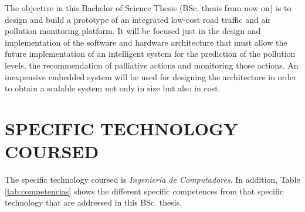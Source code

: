 \documentclass{pre-tfg}
\begin{document}
The objective in this Bachelor of Science Thesis (BSc. thesis from now on) is to design and build a prototype of an integrated low-cost road traffic and air pollution monitoring platform. It will be focused just in the design and implementation of the software and hardware architecture that must allow the future implementation of an intelligent system for the prediction of the pollution levels, the recommendation of palliative actions and monitoring those actions. An inexpensive embedded system will be used for designing the architecture in order to obtain a scalable system not only in size but also in cost.



\section{SPECIFIC TECHNOLOGY COURSED}

The specific technology coursed is \emph{Ingeniería de Computadores}. In addition, Table \ref{tab:competencias} shows the different specific competences from that specific technology that are addressed in this BSc. thesis. 
\end{document}
